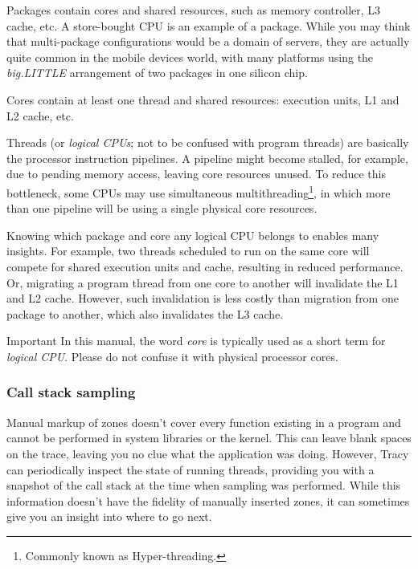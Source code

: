 \documentclass[hidelinks,titlepage,a4paper]{article}
\begin{document}
Packages contain cores and shared resources, such as memory controller, L3 cache, etc. A store-bought CPU is an example of a package. While you may think that multi-package configurations would be a domain of servers, they are actually quite common in the mobile devices world, with many platforms using the \emph{big.LITTLE} arrangement of two packages in one silicon chip.

Cores contain at least one thread and shared resources: execution units, L1 and L2 cache, etc.

Threads (or \emph{logical CPUs}; not to be confused with program threads) are basically the processor instruction pipelines. A pipeline might become stalled, for example, due to pending memory access, leaving core resources unused. To reduce this bottleneck, some CPUs may use simultaneous multithreading\footnote{Commonly known as Hyper-threading.}, in which more than one pipeline will be using a single physical core resources.

Knowing which package and core any logical CPU belongs to enables many insights. For example, two threads scheduled to run on the same core will compete for shared execution units and cache, resulting in reduced performance. Or, migrating a program thread from one core to another will invalidate the L1 and L2 cache. However, such invalidation is less costly than migration from one package to another, which also invalidates the L3 cache.

\begin{bclogo}[
noborder=true,
couleur=black!5,
logo=\bcbombe
]{Important}
In this manual, the word \emph{core} is typically used as a short term for \emph{logical CPU}. Please do not confuse it with physical processor cores.
\end{bclogo}

\subsubsection{Call stack sampling}
\label{sampling}

Manual markup of zones doesn't cover every function existing in a program and cannot be performed in system libraries or the kernel. This can leave blank spaces on the trace, leaving you no clue what the application was doing. However, Tracy can periodically inspect the state of running threads, providing you with a snapshot of the call stack at the time when sampling was performed. While this information doesn't have the fidelity of manually inserted zones, it can sometimes give you an insight into where to go next.
\end{document}
